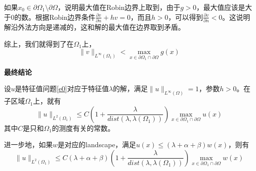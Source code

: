 \documentclass[UTF8,12pt]{article}
\begin{document}
如果$x_0 \in \partial \Omega_1 \setminus \partial \Omega $，说明最大值在Robin边界上取到，由于$g > 0$，最大值应该是大于0的数。根据Robin边界条件$\frac{\partial v}{\partial n} + h v = 0$，而且$h > 0$，可以得到$\frac{\partial v}{\partial n} < 0$。这说明解沿外法方向是递减的，这和解的最大值在边界取到矛盾。

综上，我们就得到了在$\Omega_1$上，$$\|v\|_{L^\infty(\Omega_1)} < \max_{x \in \partial \Omega_1 \cap \partial \Omega} g(x)$$

\vline

\textbf{最终结论}

设$u$是特征值问题\ref{e0}对应于特征值$\lambda$的解，满足$\|u\|_{L^\infty(\Omega)} = 1$，参数$h > 0$。在子区域$\Omega_1$上，就有
$$ \|u\|_{L^2(\Omega_1)} \leq C (1 + \frac{\lambda}{dist(\lambda, \lambda(\Omega_1))}) \max_{x \in \partial \Omega_1 \cap \partial \Omega} u(x) $$
其中$C$是只和$\Omega_1$的测度有关的常数。

进一步地，如果$w$是对应的landscape，满足$u(x) \leq (\lambda + \alpha + \beta) w(x)$，则有
$$ \|u\|_{L^2(\Omega_1)} \leq C (\lambda + \alpha + \beta) (1 + \frac{\lambda}{dist(\lambda, \lambda(\Omega_1))}) \max_{x \in \partial \Omega_1 \cap \partial \Omega} w(x) $$
\end{document}
